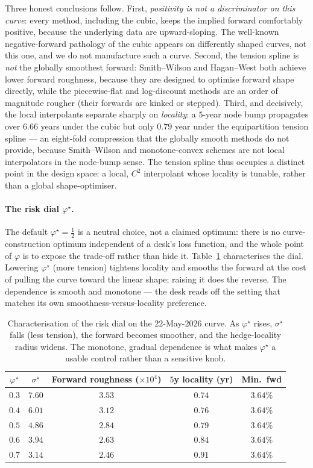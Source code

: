 \documentclass[10pt]{article}
\begin{document}
Three honest conclusions follow. First, \emph{positivity is not a discriminator on this curve}:
every method, including the cubic, keeps the implied forward comfortably positive, because the
underlying data are upward-sloping. The well-known negative-forward pathology of the cubic
appears on differently shaped curves, not this one, and we do not manufacture such a curve.
Second, the tension spline is \emph{not} the globally smoothest forward: Smith--Wilson and
Hagan--West both achieve lower forward roughness, because they are designed to optimise forward
shape directly, while the piecewise-flat and log-discount methods are an order of magnitude
rougher (their forwards are kinked or stepped). Third, and decisively, the local interpolants
separate sharply on \emph{locality}: a $5$-year node bump propagates over $6.66$ years under the
cubic but only $0.79$ year under the equipartition tension spline --- an eight-fold compression
that the globally smooth methods do not provide, because Smith--Wilson and monotone-convex
schemes are not local interpolators in the node-bump sense. The tension spline thus occupies a
distinct point in the design space: a local, $C^2$ interpolant whose locality is tunable, rather
than a global shape-optimiser.

\paragraph{The risk dial $\varphi^\star$.} The default $\varphi^\star=\tfrac12$ is a neutral
choice, not a claimed optimum: there is no curve-construction optimum independent of a desk's
loss function, and the whole point of $\varphi$ is to expose the trade-off rather than hide it.
Table~\ref{tab:phisweep} characterises the dial. Lowering $\varphi^\star$ (more tension)
tightens locality and smooths the forward at the cost of pulling the curve toward the linear
shape; raising it does the reverse. The dependence is smooth and monotone --- the desk reads off
the setting that matches its own smoothness-versus-locality preference.

\begin{table}[h]\centering\small
\begin{tabular}{ccccc}
\hline
$\varphi^\star$ & $\sigma^\star$ & Forward roughness ($\times10^4$) & $5$y locality (yr) & Min.\ fwd\\
\hline
$0.3$ & $7.60$ & $3.53$ & $0.74$ & $3.64\%$\\
$0.4$ & $6.01$ & $3.12$ & $0.76$ & $3.64\%$\\
$0.5$ & $4.86$ & $2.84$ & $0.79$ & $3.64\%$\\
$0.6$ & $3.94$ & $2.63$ & $0.84$ & $3.64\%$\\
$0.7$ & $3.14$ & $2.46$ & $0.91$ & $3.64\%$\\
\hline
\end{tabular}
\caption{Characterisation of the risk dial on the $22$-May-$2026$ curve. As $\varphi^\star$ rises,
$\sigma^\star$ falls (less tension), the forward becomes smoother, and the hedge-locality radius
widens. The monotone, gradual dependence is what makes $\varphi^\star$ a usable control rather
than a sensitive knob.}\label{tab:phisweep}
\end{table}
\end{document}
